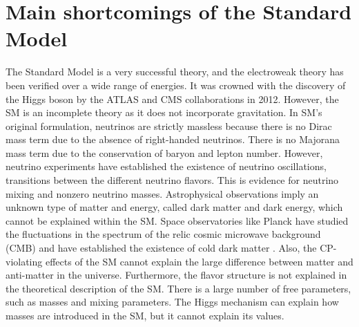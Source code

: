 \section{Main shortcomings of the Standard Model}
The Standard Model is a very successful theory, and the electroweak theory has been verified over a wide range of energies. It was crowned with the discovery of the Higgs boson by the ATLAS and CMS collaborations in 2012. However, the SM is an incomplete theory as it does not incorporate gravitation. In SM's original formulation, neutrinos are strictly massless because there is no Dirac mass term due to the absence of right-handed neutrinos. There is no Majorana mass term due to the conservation of baryon and lepton number. However, neutrino experiments have established the existence of neutrino oscillations, transitions between the different neutrino flavors. This is evidence for neutrino mixing and nonzero neutrino masses. Astrophysical observations imply an unknown type of matter and energy, called dark matter and dark energy, which cannot be explained within the SM. Space observatories like Planck have studied the fluctuations in the spectrum of the relic cosmic microwave background (CMB) and have established the existence of cold dark matter \cite{Ade:2015xua}. Also, the CP-violating effects of the SM cannot explain the large difference between matter and anti-matter in the universe. Furthermore, the flavor structure is not explained in the theoretical description of the SM. There is a large number of free parameters, such as masses and mixing parameters. The Higgs mechanism can explain how masses are introduced in the SM, but it cannot explain its values.

